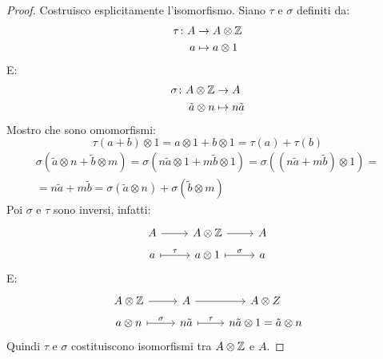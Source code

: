 \begin{proof}
  Costruisco esplicitamente l'isomorfismo. Siano $ \tau $ e $ \sigma $ definiti da:
  \begin{align*}
    \tau \colon A & \to A \otimes \mathbb{Z} \\
    a & \mapsto a \otimes 1
  \end{align*}
  E:
  \begin{align*}
    \sigma \colon A \otimes \mathbb{Z} & \to A \\
    \tilde{a} \otimes n & \mapsto n \tilde{a}
  \end{align*}
  Mostro che sono omomorfismi:
  \[
    \tau(a + b) \otimes 1 = a \otimes 1 + b \otimes 1 = \tau(a) + \tau(b)
  \]
  \begin{gather*}
    \sigma(\tilde{a} \otimes n + \tilde{b} \otimes m ) = \sigma(n \tilde{a} \otimes 1 + m \tilde{b} \otimes
    1) = \sigma ((n \tilde{a} + m\tilde{b}) \otimes 1) = \\ = n \tilde{a} + m \tilde{b} =
    \sigma(\tilde{a} \otimes n) + \sigma(\tilde{b} \otimes m)
  \end{gather*}
  Poi $ \sigma $ e $ \tau $ sono inversi, infatti:
  \[
    \begin{tikzcd}[nodes={row sep = 5 pt}]
      A \rar{} & A \otimes \Z \rar & A \\
      a \arrow[mapsto]{r}{\tau} & a \otimes 1 \arrow[mapsto]{r}{\sigma} & a
    \end{tikzcd}
  \]
  E:
  \[
    \begin{tikzcd}[nodes={row sep = 5 pt}]
      A \otimes \Z \rar & A \rar & A \otimes Z \\
      a \otimes n \arrow[mapsto]{r}{\sigma} & n \tilde{a} \arrow[mapsto]{r}{\tau} & n \tilde{a} \otimes 1 = \tilde{a} \otimes n
    \end{tikzcd}
  \]
  Quindi $ \tau $ e $ \sigma $ costituiscono isomorfismi tra $ A \otimes \mathbb{Z} $ e $ A $.
\end{proof}
